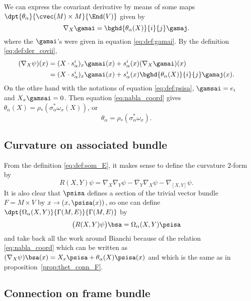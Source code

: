 We can express the covariant derivative by means of some maps $\dpt{\theta_{\alpha}}{\cvec(M)\times M}{\End(V)}$ given by
\begin{equation}
	\nabla_X\gamai=\bghd{\theta_{\alpha}(X)}{i}{j}\gamaj.
\end{equation}
where the $\gamai$'s were given in equation \eqref{eq:def:gamai}. By the definition \eqref{eq:def:der_covii},
\[
	\begin{split}
		(\nabla_X\psi)(x)&=(X\cdot s^i_{\alpha})_x\gamai(x)+s^i_{\alpha}(x)(\nabla_X\gamai)(x)\\
		&=(X\cdot s^i_{\alpha})_x\gamai(x)+s^i_{\alpha}(x)\bghd{\theta_{\alpha}(X)}{i}{j}\gamaj(x).
	\end{split}
\]
On the othre hand with the notations of equation \eqref{eq:def:psisa}, $\gamsai=e_i$ and $X_x\gamsai=0$. Then equation \eqref{eq:nabla_coord} gives $\theta_{\alpha}(X)=\rho_*(\sigma_{\alpha}^*\omega_x(X))$, or
\begin{equation}
	\theta_{\alpha}=\rho_*(\sigma^*_{\alpha}\omega_x).
\end{equation}

\subsection{Curvature on associated bundle}

From the definition \eqref{eq:def:som_E}, it makes sense to define the curvature $2$-form by
\[
	R(X,Y)\psi=\nabla_X\nabla_Y\psi-\nabla_Y\nabla_X\psi-\nabla_{[X,Y]}\psi.
\]
It is also clear that $\psisa$ defines a section of the trivial vector bundle $F=M\times V$ by $x\to (x,\psisa(x))$, so one can define  $\dpt{\Omega_{\alpha}(X,Y)}{\Gamma(M,E)}{\Gamma(M,E)}$ by
\[
	\big(  R(X,Y)\psi  \big)\bsa=\Omega_{\alpha}(X,Y)\psisa
\]
and take back all the work around Bianchi because of the relation \eqref{eq:nabla_coord} which can be written as $(\nabla_X\psi)\bsa(x)=X_x\psisa+\theta_{\alpha}(X)\psisa(x)$ and which is the same as in proposition~\ref{prop:thet_conn_F}.

\subsection{Connection on frame bundle}

